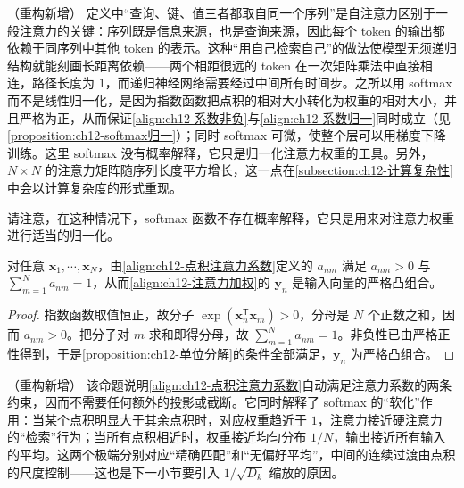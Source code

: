 \documentclass[../../main.tex]{subfiles}
\begin{document}
\begin{remark}（重构新增）
定义中“查询、键、值三者都取自同一个序列”是自注意力区别于一般注意力的关键：序列既是信息来源，也是查询来源，因此每个 token 的输出都依赖于同序列中其他 token 的表示。这种“用自己检索自己”的做法使模型无须递归结构就能刻画长距离依赖——两个相距很远的 token 在一次矩阵乘法中直接相连，路径长度为 $1$，而递归神经网络需要经过中间所有时间步。之所以用 softmax 而不是线性归一化，是因为指数函数把点积的相对大小转化为权重的相对大小，并且严格为正，从而保证\eqref{align:ch12-系数非负}与\eqref{align:ch12-系数归一}同时成立（见\cref{proposition:ch12-softmax归一}）；同时 softmax 可微，使整个层可以用梯度下降训练。这里 softmax 没有概率解释，它只是归一化注意力权重的工具。另外，$N\times N$ 的注意力矩阵随序列长度平方增长，这一点在\cref{subsection:ch12-计算复杂性}中会以计算复杂度的形式重现。
\end{remark}

请注意，在这种情况下，softmax 函数不存在概率解释，它只是用来对注意力权重进行适当的归一化。

\begin{proposition}\label{proposition:ch12-softmax归一}
对任意 $\mathbf{x}_1,\cdots,\mathbf{x}_N$，由\eqref{align:ch12-点积注意力系数}定义的 $a_{nm}$ 满足 $a_{nm}>0$ 与 $\sum_{m=1}^{N}a_{nm}=1$，从而\eqref{align:ch12-注意力加权}的 $\mathbf{y}_n$ 是输入向量的严格凸组合。
\end{proposition}

\begin{proof}
指数函数取值恒正，故分子 $\exp(\mathbf{x}_n^{\mathsf{T}}\mathbf{x}_m)>0$，分母是 $N$ 个正数之和，因而 $a_{nm}>0$。把分子对 $m$ 求和即得分母，故 $\sum_{m=1}^{N}a_{nm}=1$。非负性已由严格正性得到，于是\cref{proposition:ch12-单位分解}的条件全部满足，$\mathbf{y}_n$ 为严格凸组合。
\end{proof}

\begin{remark}（重构新增）
该命题说明\eqref{align:ch12-点积注意力系数}自动满足注意力系数的两条约束，因而不需要任何额外的投影或截断。它同时解释了 softmax 的“软化”作用：当某个点积明显大于其余点积时，对应权重趋近于 $1$，注意力接近硬注意力的“检索”行为；当所有点积相近时，权重接近均匀分布 $1/N$，输出接近所有输入的平均。这两个极端分别对应“精确匹配”和“无偏好平均”，中间的连续过渡由点积的尺度控制——这也是下一小节要引入 $1/\sqrt{D_k}$ 缩放的原因。
\end{remark}
\end{document}

